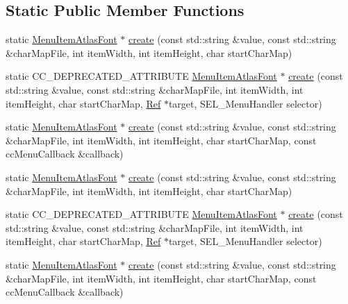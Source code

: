 \subsection*{Static Public Member Functions}
\begin{DoxyCompactItemize}
\item 
static \hyperlink{classMenuItemAtlasFont}{Menu\+Item\+Atlas\+Font} $\ast$ \hyperlink{classMenuItemAtlasFont_acdfab9e60981134f2905bb6bc4dc592d}{create} (const std\+::string \&value, const std\+::string \&char\+Map\+File, int item\+Width, int item\+Height, char start\+Char\+Map)
\item 
static C\+C\+\_\+\+D\+E\+P\+R\+E\+C\+A\+T\+E\+D\+\_\+\+A\+T\+T\+R\+I\+B\+U\+TE \hyperlink{classMenuItemAtlasFont}{Menu\+Item\+Atlas\+Font} $\ast$ \hyperlink{classMenuItemAtlasFont_a2b7dfd0d03ff09af3cfa6656c2f7a096}{create} (const std\+::string \&value, const std\+::string \&char\+Map\+File, int item\+Width, int item\+Height, char start\+Char\+Map, \hyperlink{classRef}{Ref} $\ast$target, S\+E\+L\+\_\+\+Menu\+Handler selector)
\item 
static \hyperlink{classMenuItemAtlasFont}{Menu\+Item\+Atlas\+Font} $\ast$ \hyperlink{classMenuItemAtlasFont_a4257e6945518624b8bad2ab43ed9456e}{create} (const std\+::string \&value, const std\+::string \&char\+Map\+File, int item\+Width, int item\+Height, char start\+Char\+Map, const cc\+Menu\+Callback \&callback)
\item 
static \hyperlink{classMenuItemAtlasFont}{Menu\+Item\+Atlas\+Font} $\ast$ \hyperlink{classMenuItemAtlasFont_a3aac957b70f89ef5f03cfd05b67c7ec4}{create} (const std\+::string \&value, const std\+::string \&char\+Map\+File, int item\+Width, int item\+Height, char start\+Char\+Map)
\item 
static C\+C\+\_\+\+D\+E\+P\+R\+E\+C\+A\+T\+E\+D\+\_\+\+A\+T\+T\+R\+I\+B\+U\+TE \hyperlink{classMenuItemAtlasFont}{Menu\+Item\+Atlas\+Font} $\ast$ \hyperlink{classMenuItemAtlasFont_af387aecdf81b2ec41e101835c4bf7111}{create} (const std\+::string \&value, const std\+::string \&char\+Map\+File, int item\+Width, int item\+Height, char start\+Char\+Map, \hyperlink{classRef}{Ref} $\ast$target, S\+E\+L\+\_\+\+Menu\+Handler selector)
\item 
static \hyperlink{classMenuItemAtlasFont}{Menu\+Item\+Atlas\+Font} $\ast$ \hyperlink{classMenuItemAtlasFont_ac8631e49e25f7eaa6fc207137c38075c}{create} (const std\+::string \&value, const std\+::string \&char\+Map\+File, int item\+Width, int item\+Height, char start\+Char\+Map, const cc\+Menu\+Callback \&callback)
\end{DoxyCompactItemize}
